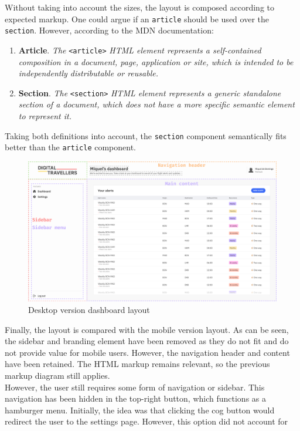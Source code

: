 \documentclass[./memory.tex]{subfiles}
\begin{document}
Without taking into account the sizes, the layout is composed according to
expected markup. One could argue if an \texttt{article} should be used over the
\texttt{section}. However, according to the MDN documentation:
\begin{enumerate}[label = -]
	\item\textbf{Article}. \emph{The} \texttt{<article>} \emph{HTML element
		represents a self-contained composition in a document, page, application or
		site, which is intended to be independently distributable or
		reusable.} \cite{mdn-article}
	\item\textbf{Section}. \emph{The} \texttt{<section>} \emph{HTML element
		represents a generic standalone section of a document, which does not have a
		more specific semantic element to represent it.} \cite{mdn-section}
\end{enumerate}
Taking both definitions into account, the \texttt{section} component
semantically fits better than the \texttt{article} component.
\begin{figure}[H]
	\centering
	\includegraphics[width=\textwidth]{./assets/designs/dashboard-layout-web.png}
	\caption{Desktop version dashboard layout}
\end{figure}
Finally, the layout is compared with the mobile version layout. As can be seen,
the sidebar and branding element have been removed as they do not fit and do not
provide value for mobile users. However, the navigation header and content have
been retained. The HTML markup remains relevant, so the previous markup diagram
still applies.
\\[8pt]
However, the user still requires some form of navigation or sidebar. This
navigation has been hidden in the top-right button, which functions as a
hamburger menu. Initially, the idea was that clicking the cog button would
redirect the user to the settings page. However, this option did not account for
\end{document}
